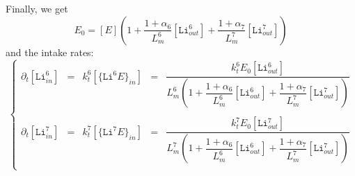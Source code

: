 \documentclass[aps,onecolumn]{revtex4}
\newcommand{\mychem}[1]{\mathtt{#1}}
\begin{document}
Finally, we get
\begin{equation}
	E_0 = [E] \left( 1 + \dfrac{1+\alpha_6}{L_m^6} [\mathtt{Li}^6_{out}] + \dfrac{1+\alpha_7}{L_m^7} [\mathtt{Li}^7_{out}] \right)
\end{equation}
and the intake rates:
\begin{equation}
	\left\lbrace
	\begin{array}{rclcl}
	\partial_t [\mychem{Li}^6_{in}] & = & k_t^6[\lbrace\mychem{Li}^6E\rbrace_{in}] & = & 
	\dfrac{k_t^6E_0[\mathtt{Li}^6_{out}]}{L_m^6\left( 1 + \dfrac{1+\alpha_6}{L_m^6} [\mathtt{Li}^6_{out}] + \dfrac{1+\alpha_7}{L_m^7} [\mathtt{Li}^7_{out}] \right)} \\
	\\
	\partial_t [\mychem{Li}^7_{in}] & = & k_t^7[\lbrace\mychem{Li}^7E\rbrace_{in}] & = & 
	\dfrac{k_t^7E_0[\mathtt{Li}^7_{out}]}{L_m^7\left( 1 + \dfrac{1+\alpha_6}{L_m^6} [\mathtt{Li}^6_{out}] + \dfrac{1+\alpha_7}{L_m^7} [\mathtt{Li}^7_{out}] \right)} \\
	\end{array}
	\right.
\end{equation}
\end{document}

